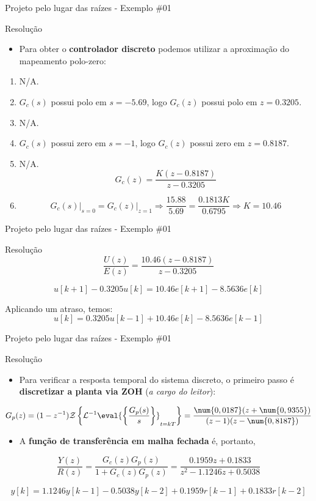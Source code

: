 \begin{frame}{Projeto pelo lugar das raízes - Exemplo \#01}
\begin{block}{Resolução}
\begin{itemize}
    \item Para obter o \textbf{controlador discreto} podemos utilizar a aproximação do mapeamento polo-zero:
\end{itemize}

	\begin{enumerate}
		\item N/A.
		\item $ G_c(s) $ possui polo em $ s=-\num{5,69} $, logo $ G_c(z) $ possui polo em $z=\num{0,3205} $.
		\item N/A.
		\item $ G_c(s) $ possui zero em $ s=-\num{1} $, logo $ G_c(z) $ possui zero em $z=\num{0,8187} $.
		\item N/A. 
		\[ G_c(z)=\dfrac{K(z-\num{0,8187})}{z-\num{0,3205}} \]
		\item
		\[
		G_c(s)\Big|_{s=0}=G_c(z)\Big|_{z=1}\Rightarrow \dfrac{\num{15,88}}{\num{5,69}}=\dfrac{\num{0,1813}K}{\num{0,6795}}\Rightarrow K=\num{10,46} \]
	\end{enumerate}
\end{block}
\end{frame}

\begin{frame}{Projeto pelo lugar das raízes - Exemplo \#01}
\begin{block}{Resolução}
$$\dfrac{U(z)}{E(z)}=\dfrac{\num{10,46}(z-\num{0,8187})}{z-\num{0,3205}}$$

$$u[k+1] - \num{0,3205} u[k]=\num{10,46}e[k+1]-\num{8,5636}e[k]$$

Aplicando um atraso, temos:\\
$$u[k]=\num{0,3205}u[k-1]+\num{10,46}e[k]-\num{8,5636}e[k-1]$$
\end{block}
\end{frame}

\begin{frame}{Projeto pelo lugar das raízes - Exemplo \#01}
\begin{block}{Resolução}
\begin{itemize}
    \item Para verificar a resposta temporal do sistema discreto, o primeiro passo é \textbf{discretizar a planta via ZOH} (\textit{a cargo do leitor}):
\end{itemize}
$$G_p(z)=(1-z^{-1})\mathcal{Z}\left\lbrace \mathcal{L}^{-1}\eval{\left\lbrace \dfrac{G_p(s)}{s}\right\rbrace}_{t=kT} \right\rbrace =\dfrac{\num{0,0187}(z+\num{0,9355})}{(z-1)(z-\num{0,8187})}$$
\begin{itemize}
    \item A \textbf{função de transferência em malha fechada} é, portanto,
\end{itemize}
$$\dfrac{Y(z)}{R(z)}=\dfrac{G_c(z)G_p(z)}{1+G_c(z)G_p(z)}=\dfrac{\num{0,1959}z+\num{0,1833}}{z^{2}-\num{1,1246}z+\num{0,5038}}$$

$$y[k]=\num{1,1246}y[k-1]-\num{0,5038}y[k-2]+\num{0,1959}r[k-1]+\num{0,1833}r[k-2]$$
\end{block}
\end{frame}

